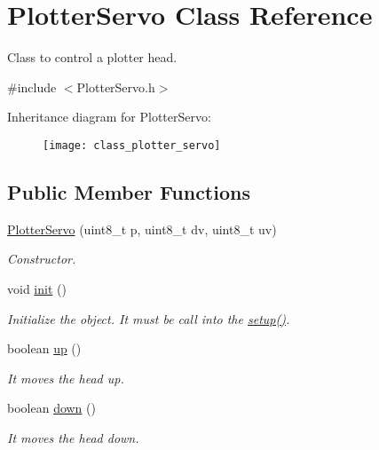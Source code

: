 \hypertarget{class_plotter_servo}{\section{Plotter\+Servo Class Reference}
\label{class_plotter_servo}
}


Class to control a plotter head.  




{\ttfamily \#include $<$Plotter\+Servo.\+h$>$}

Inheritance diagram for Plotter\+Servo\+:\begin{figure}[H]
\begin{center}
\leavevmode
\texttt{[image: class\_plotter\_servo]}
\end{center}
\end{figure}
\subsection*{Public Member Functions}
\begin{DoxyCompactItemize}
\item 
\hyperlink{class_plotter_servo_a3e1bb246a0c6b6df9f78b1a5a9343ef0}{Plotter\+Servo} (uint8\+\_\+t p, uint8\+\_\+t dv, uint8\+\_\+t uv)
\begin{DoxyCompactList}\small\item\em Constructor. \end{DoxyCompactList}\item 
void \hyperlink{class_plotter_servo_ad35c8f57eaeeffa768340a777c105aeb}{init} ()
\begin{DoxyCompactList}\small\item\em Initialize the object. It must be call into the \hyperlink{easy___c_n_c_8cpp_a4fc01d736fe50cf5b977f755b675f11d}{setup()}. \end{DoxyCompactList}\item 
boolean \hyperlink{class_plotter_servo_ab3d7dc74cd89c962a9cf27bdd210653f}{up} ()
\begin{DoxyCompactList}\small\item\em It moves the head up. \end{DoxyCompactList}\item 
boolean \hyperlink{class_plotter_servo_a06411670f5c5799ec84be0cffda3772b}{down} ()
\begin{DoxyCompactList}\small\item\em It moves the head down. \end{DoxyCompactList}\end{DoxyCompactItemize}
